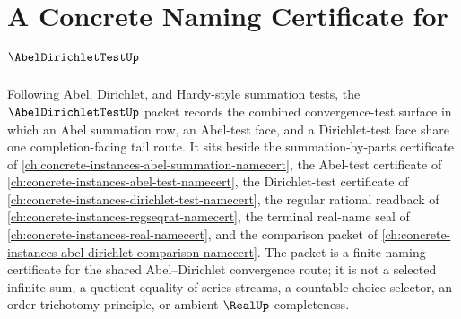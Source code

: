 \chapter{A Concrete Naming Certificate for $\AbelDirichletTestUp$}
\label{ch:concrete-instances-abel-dirichlet-test-namecert}

Following Abel, Dirichlet, and Hardy-style summation tests, the $\AbelDirichletTestUp$ packet records the combined convergence-test surface in which an Abel summation row, an Abel-test face, and a Dirichlet-test face share one completion-facing tail route. It sits beside the summation-by-parts certificate of \autoref{ch:concrete-instances-abel-summation-namecert}, the Abel-test certificate of \autoref{ch:concrete-instances-abel-test-namecert}, the Dirichlet-test certificate of \autoref{ch:concrete-instances-dirichlet-test-namecert}, the regular rational readback of \autoref{ch:concrete-instances-regseqrat-namecert}, the terminal real-name seal of \autoref{ch:concrete-instances-real-namecert}, and the comparison packet of \autoref{ch:concrete-instances-abel-dirichlet-comparison-namecert}. The packet is a finite naming certificate for the shared Abel--Dirichlet convergence route; it is not a selected infinite sum, a quotient equality of series streams, a countable-choice selector, an order-trichotomy principle, or ambient $\RealUp$ completeness.

